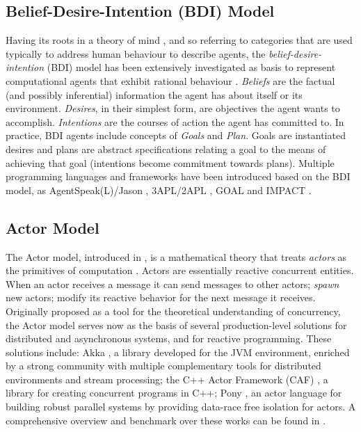 \subsection{Belief-Desire-Intention (BDI) Model}
Having its roots in a theory of mind \cite{bratman1987intention}, and so referring to categories that are used typically to address human behaviour to describe agents, the \textit{belief-desire-intention} (BDI) model \cite{Rao1995} has been extensively investigated as basis to represent computational agents that exhibit rational behaviour \cite{Herzig2017}. 
\textit{Beliefs} are the factual (and possibly inferential) information the agent has about itself or its environment. \textit{Desires}, in their simplest form, are objectives the agent wants to accomplish. %
\textit{Intentions} are the courses of action the agent has committed to. In practice, BDI agents include concepts of \textit{Goals} and \textit{Plan}. Goals are instantiated desires %
and plans are abstract specifications relating a goal to the means of achieving that goal (intentions become commitment towards plans). Multiple programming languages and frameworks have been introduced based on the BDI model, as AgentSpeak(L)/Jason \cite{RaoAS1996,Bordini2005}, 3APL/2APL \cite{Dastani2APL}, GOAL \cite{Hindriks2009a} and IMPACT \cite{IMPACT}.

\vspace{-5pt}
\subsection{Actor Model}
The Actor model, introduced in \cite{Hewitt}, is a mathematical theory that treats \textit{actors} as the primitives of computation \cite{hewitt2010actor}. Actors are essentially reactive concurrent entities. %
When an actor receives a message it can %
send messages to other actors; \textit{spawn} new actors; modify its reactive behavior for the next message it receives.
Originally proposed as a tool for the theoretical understanding of concurrency, the Actor model serves now as the basis of several production-level solutions for distributed and asynchronous systems, and for reactive programming. These solutions include: Akka \cite{AKKA}, a library developed for the JVM environment, enriched by a strong community with multiple complementary tools for distributed environments and stream processing; the C++ Actor Framework (CAF) \cite{CAF}, a library %
for creating concurrent programs in C++; Pony \cite{PONY1,PONY2}, an actor language for building robust parallel systems by providing data-race free isolation for actors. A comprehensive overview and benchmark over these works can be found in \cite{RunActor}. 

